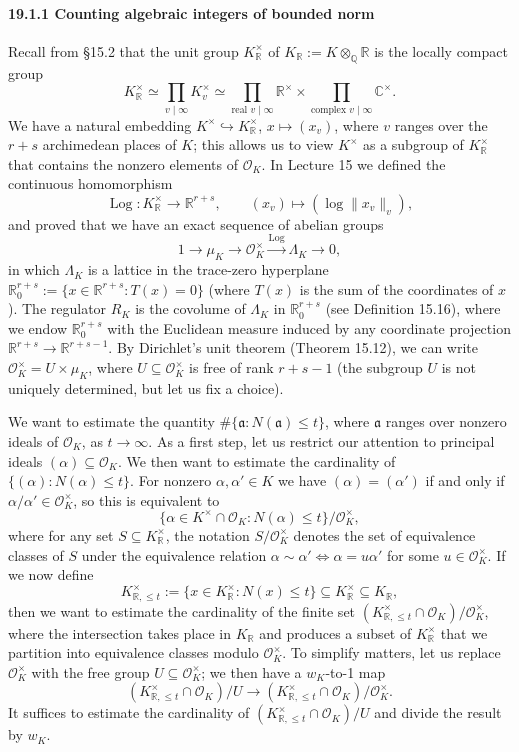 \documentclass[UTF8,11pt]{ctexart}
\theoremstyle{definition}
\newcommand{\R}{\mathbb R}
\newcommand{\C}{\mathbb C}
\newcommand{\Q}{\mathbb Q}
\begin{document}
\paragraph{19.1.1 Counting algebraic integers of bounded norm}
Recall from \S15.2 that the unit group $K_\R^\times$ of $K_\R:=K\otimes_\Q\R$ is the locally compact group
\[
K_\R^\times\simeq\prod_{v\mid\infty}K_v^\times\simeq\prod_{\text{real }v\mid\infty}\R^\times\times\prod_{\text{complex }v\mid\infty}\C^\times.
\]
We have a natural embedding $K^\times\hookrightarrow K_\R^\times$, $x\mapsto(x_v)$, where $v$ ranges over the $r+s$ archimedean places of $K$; this allows us to view $K^\times$ as a subgroup of $K_\R^\times$ that contains the nonzero elements of $\mathcal O_K$. In Lecture 15 we defined the continuous homomorphism
\[
\operatorname{Log}:K_\R^\times\to\R^{r+s},\qquad (x_v)\mapsto(\log\|x_v\|_v),
\]
and proved that we have an exact sequence of abelian groups
\[
1\longrightarrow\mu_K\longrightarrow\mathcal O_K^\times\xrightarrow{\operatorname{Log}}\Lambda_K\longrightarrow0,
\]
in which $\Lambda_K$ is a lattice in the trace-zero hyperplane $\R^{r+s}_0:=\{x\in\R^{r+s}:T(x)=0\}$ (where $T(x)$ is the sum of the coordinates of $x$). The regulator $R_K$ is the covolume of $\Lambda_K$ in $\R^{r+s}_0$ (see Definition 15.16), where we endow $\R^{r+s}_0$ with the Euclidean measure induced by any coordinate projection $\R^{r+s}\to\R^{r+s-1}$. By Dirichlet's unit theorem (Theorem 15.12), we can write $\mathcal O_K^\times=U\times\mu_K$, where $U\subseteq\mathcal O_K^\times$ is free of rank $r+s-1$ (the subgroup $U$ is not uniquely determined, but let us fix a choice).

We want to estimate the quantity $\#\{\mathfrak a:N(\mathfrak a)\leq t\}$, where $\mathfrak a$ ranges over nonzero ideals of $\mathcal O_K$, as $t\to\infty$. As a first step, let us restrict our attention to principal ideals $(\alpha)\subseteq\mathcal O_K$. We then want to estimate the cardinality of $\{(\alpha):N(\alpha)\leq t\}$. For nonzero $\alpha,\alpha'\in K$ we have $(\alpha)=(\alpha')$ if and only if $\alpha/\alpha'\in\mathcal O_K^\times$, so this is equivalent to
\[
\{\alpha\in K^\times\cap\mathcal O_K:N(\alpha)\leq t\}/\mathcal O_K^\times,
\]
where for any set $S\subseteq K_\R^\times$, the notation $S/\mathcal O_K^\times$ denotes the set of equivalence classes of $S$ under the equivalence relation $\alpha\sim\alpha'\Leftrightarrow\alpha=u\alpha'$ for some $u\in\mathcal O_K^\times$. If we now define
\[
K_{\R,\leq t}^\times:=\{x\in K_\R^\times:N(x)\leq t\}\subseteq K_\R^\times\subseteq K_\R,
\]
then we want to estimate the cardinality of the finite set $(K_{\R,\leq t}^\times\cap\mathcal O_K)/\mathcal O_K^\times$, where the intersection takes place in $K_\R$ and produces a subset of $K_\R^\times$ that we partition into equivalence classes modulo $\mathcal O_K^\times$. To simplify matters, let us replace $\mathcal O_K^\times$ with the free group $U\subseteq\mathcal O_K^\times$; we then have a $w_K$-to-1 map
\[
(K_{\R,\leq t}^\times\cap\mathcal O_K)/U\longrightarrow(K_{\R,\leq t}^\times\cap\mathcal O_K)/\mathcal O_K^\times.
\]
It suffices to estimate the cardinality of $(K_{\R,\leq t}^\times\cap\mathcal O_K)/U$ and divide the result by $w_K$.
\end{document}
